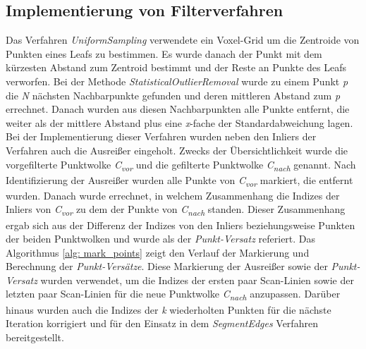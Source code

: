 \subsection{Implementierung von Filterverfahren}
Das Verfahren \textit{UniformSampling} verwendete ein Voxel-Grid um die Zentroide von Punkten eines Leafs zu bestimmen. Es wurde danach der Punkt mit dem kürzesten Abstand zum Zentroid bestimmt und der Reste an Punkte des Leafs verworfen. Bei der Methode \textit{StatisticalOutlierRemoval} wurde zu einem Punkt \textit{p} die \textit{N} nächsten Nachbarpunkte gefunden und deren mittleren Abstand zum \textit{p} errechnet. Danach wurden aus diesen Nachbarpunkten alle Punkte entfernt, die weiter als der mittlere Abstand plus eine \textit{x}-fache der Standardabweichung lagen. Bei der Implementierung dieser Verfahren wurden neben den Inliers der Verfahren auch die Ausreißer eingeholt. Zwecks der Übersichtlichkeit wurde die vorgefilterte Punktwolke \textit{C\textsubscript{vor}} und die gefilterte Punktwolke \textit{C\textsubscript{nach}} genannt. Nach Identifizierung der Ausreißer wurden alle Punkte von \textit{C\textsubscript{vor}} markiert, die entfernt wurden. Danach wurde errechnet, in welchem Zusammenhang die Indizes der Inliers von \textit{C\textsubscript{vor}} zu dem der Punkte von \textit{C\textsubscript{nach}} standen. Dieser Zusammenhang ergab sich aus der Differenz der Indizes von den Inliers beziehungsweise Punkten der beiden Punktwolken und wurde als der \textit{Punkt-Versatz} referiert. Das Algorithmus \ref{alg: mark_points} zeigt den Verlauf der Markierung und Berechnung der \textit{Punkt-Versätze}. Diese Markierung der Ausreißer sowie der \textit{Punkt-Versatz} wurden verwendet, um die Indizes der ersten paar Scan-Linien sowie der letzten paar Scan-Linien für die neue Punktwolke \textit{C\textsubscript{nach}} anzupassen. Darüber hinaus wurden auch die Indizes der \textit{k} wiederholten Punkten für die nächste Iteration korrigiert und für den Einsatz in dem \textit{SegmentEdges} Verfahren bereitgestellt. 

